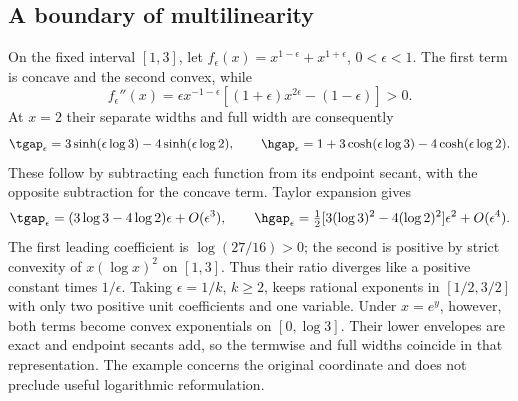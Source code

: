 \subsection{A boundary of multilinearity}\label{subsec:rational-powers}
\begin{example}\label{ex:rational-powers}
On the fixed interval $[1,3]$, let
$f_\epsilon(x)=x^{1-\epsilon}+x^{1+\epsilon}$, $0<\epsilon<1$.
The first term is concave and the second convex, while
\[
 f_\epsilon''(x)=\epsilon x^{-1-\epsilon}
       [(1+\epsilon)x^{2\epsilon}-(1-\epsilon)]>0.
\]
At $x=2$ their separate widths and full width are consequently
\[
 \tgap_\epsilon=3\sinh(\epsilon\log3)-4\sinh(\epsilon\log2),
 \qquad
 \hgap_\epsilon=1+3\cosh(\epsilon\log3)-4\cosh(\epsilon\log2).
\]
These follow by subtracting each function from its endpoint secant,
with the opposite subtraction for the concave term. Taylor expansion
gives
\[
 \tgap_\epsilon=(3\log3-4\log2)\epsilon+O(\epsilon^3),\qquad
 \hgap_\epsilon=\tfrac12[3(\log3)^2-4(\log2)^2]\epsilon^2
                                      +O(\epsilon^4).
\]
The first leading coefficient is $\log(27/16)>0$; the second is
positive by strict convexity of $x(\log x)^2$ on $[1,3]$.
Thus their ratio diverges like a positive constant times $1/\epsilon$.
Taking $\epsilon=1/k$, $k\ge2$, keeps rational exponents in
$[1/2,3/2]$ with only two positive unit coefficients and one variable.
Under $x=e^y$, however, both terms become convex exponentials on
$[0,\log3]$. Their lower envelopes are exact and endpoint secants
add, so the termwise and full widths coincide in that representation.
The example concerns the original coordinate and does not preclude
useful logarithmic reformulation.
\end{example}
